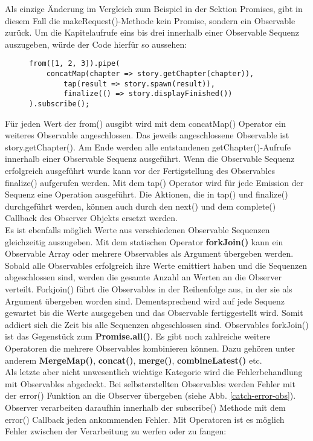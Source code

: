 \noindent
Als einzige Änderung im Vergleich zum Beispiel in der Sektion Promises, gibt in diesem Fall die makeRequest()-Methode kein Promise, sondern ein Observable zurück. Um die Kapitelaufrufe eins bis drei innerhalb einer Observable Sequenz auszugeben, würde der Code hierfür so aussehen:

\begin{figure}[H]
\begin{lstlisting}[basicstyle=\small]
from([1, 2, 3]).pipe(
    concatMap(chapter => story.getChapter(chapter)),
        tap(result => story.spawn(result)),
        finalize(() => story.displayFinished())
).subscribe();
\end{lstlisting}
\end{figure}

\noindent
Für jeden Wert der from() ausgibt wird mit dem concatMap() Operator ein weiteres Observable angeschlossen. Das jeweils angeschlossene Observable ist story.getChapter(). Am Ende werden alle entstandenen getChapter()-Aufrufe innerhalb einer Observable Sequenz ausgeführt. Wenn die Observable Sequenz erfolgreich ausgeführt wurde kann vor der Fertigstellung des Observables finalize() aufgerufen werden. Mit dem tap() Operator wird für jede Emission der Sequenz eine Operation ausgeführt. Die Aktionen, die in tap() und finalize() durchgeführt werden, können auch durch den next() und dem complete() Callback des Observer Objekts ersetzt werden.\\

\noindent
Es ist ebenfalls möglich Werte aus verschiedenen Observable Sequenzen gleichzeitig auszugeben. Mit dem statischen Operator \textbf{forkJoin()} kann ein Observable Array oder mehrere Observables als Argument übergeben werden. Sobald alle Observables erfolgreich ihre Werte emittiert haben und die Sequenzen abgeschlossen sind, werden die gesamte Anzahl an Werten an die Observer verteilt. Forkjoin() führt die Observables in der Reihenfolge aus, in der sie als Argument übergeben worden sind. Dementsprechend wird auf jede Sequenz gewartet bis die Werte ausgegeben und das Observable fertiggestellt wird. Somit addiert sich die Zeit bis alle Sequenzen abgeschlossen sind. Observables forkJoin() ist das Gegenstück zum \textbf{Promise.all()}. Es gibt noch zahlreiche weitere Operatoren die mehrere Observables kombinieren können. Dazu gehören unter anderem \textbf{MergeMap()}, \textbf{concat()}, \textbf{merge()}, \textbf{combineLatest()} etc.\\


\noindent
Als letzte aber nicht unwesentlich wichtige Kategorie wird die Fehlerbehandlung mit Observables abgedeckt. Bei selbsterstellten Observables werden Fehler mit der error() Funktion an die Observer übergeben (siehe Abb. \ref{catch-error-obs}). Observer verarbeiten daraufhin innerhalb der subscribe() Methode mit dem error() Callback jeden ankommenden Fehler. Mit Operatoren ist es möglich Fehler zwischen der Verarbeitung zu werfen oder zu fangen:

